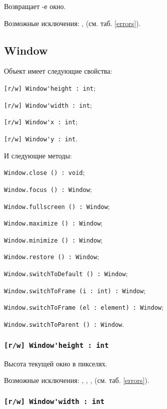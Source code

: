 Возвращает -е окно.

Возможные исключения: ,  (см. таб. \ref{errors}).

\subsection{{\color{orange} Window}}

Объект \window{} имеет следующие свойства:
\begin{icItems}
	\item \lstinline|[r/w] Window'height : int|;
	\item \lstinline|[r/w] Window'width : int|;
	\item \lstinline|[r/w] Window'x : int|;
	\item \lstinline|[r/w] Window'y : int|.
\end{icItems}

И следующие методы:
\begin{icItems}
	\item \lstinline|Window.close () : void|;
	\item \lstinline|Window.focus () : Window|;
	\item \lstinline|Window.fullscreen () : Window|;
	\item \lstinline|Window.maximize () : Window|;
	\item \lstinline|Window.minimize () : Window|;
	\item \lstinline|Window.restore () : Window|;
	\item \lstinline|Window.switchToDefault () : Window|;
	\item \lstinline|Window.switchToFrame (i : int) : Window|;
	\item \lstinline|Window.switchToFrame (el : element) : Window|;
	\item \lstinline|Window.switchToParent () : Window|.
\end{icItems}

\subsubsection{\lstinline|[r/w] Window'height : int|}

Высота текущей окно в пикселях.

Возможные исключения: , , ,  (см. таб. \ref{errors}).

\subsubsection{\lstinline|[r/w] Window'width : int|}

